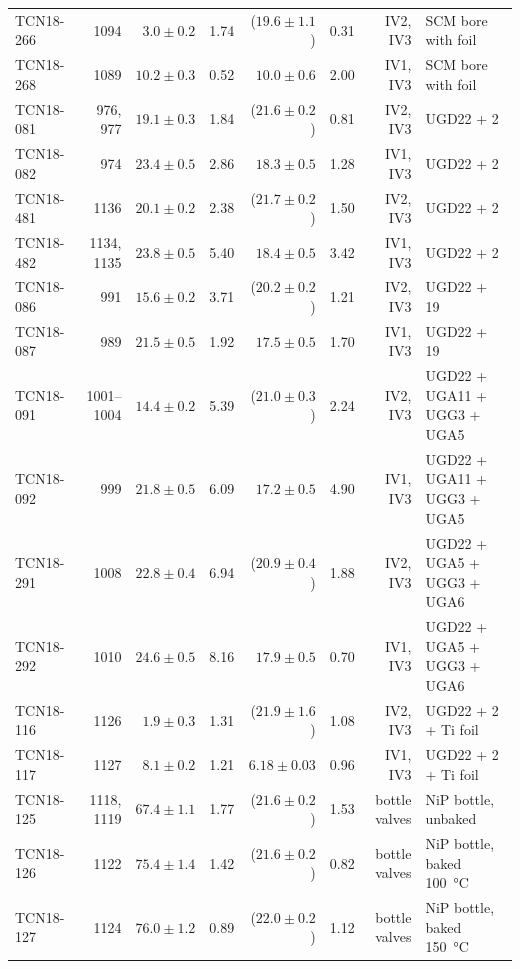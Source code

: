 \documentclass[10pt,letterpaper]{article}
\begin{document}
\begin{table}
\begin{tabular}{l r r r r r r l}
TCN18-266 & 1094 & $3.0 \pm 0.2$ & 1.74 & ($19.6 \pm 1.1$) & 0.31 & IV2, IV3 & SCM bore with foil \\
TCN18-268 & 1089 & $10.2 \pm 0.3$ & 0.52 & $10.0 \pm 0.6$ & 2.00 & IV1, IV3 & SCM bore with foil \\
TCN18-081 & 976, 977 & $19.1 \pm 0.3$ & 1.84 & ($21.6 \pm 0.2$) & 0.81 & IV2, IV3 & UGD22 + 2 \\
TCN18-082 & 974 & $23.4 \pm 0.5$ & 2.86 & $18.3 \pm 0.5$ & 1.28 & IV1, IV3 & UGD22 + 2 \\
TCN18-481 & 1136 & $20.1 \pm 0.2$ & 2.38 & ($21.7 \pm 0.2$) & 1.50 & IV2, IV3 & UGD22 + 2 \\
TCN18-482 & 1134, 1135 & $23.8 \pm 0.5$ & 5.40 & $18.4 \pm 0.5$ & 3.42 & IV1, IV3 & UGD22 + 2 \\
TCN18-086 & 991 & $15.6 \pm 0.2$ & 3.71 & ($20.2 \pm 0.2$) & 1.21 & IV2, IV3 & UGD22 + 19 \\
TCN18-087 & 989 & $21.5 \pm 0.5$ & 1.92 & $17.5 \pm 0.5$ & 1.70 & IV1, IV3 & UGD22 + 19 \\
TCN18-091 & 1001--1004 & $14.4 \pm 0.2$ & 5.39 & ($21.0 \pm 0.3$) & 2.24 & IV2, IV3 & UGD22 + UGA11 + UGG3 + UGA5 \\
TCN18-092 & 999 & $21.8 \pm 0.5$ & 6.09 & $17.2 \pm 0.5$ & 4.90 & IV1, IV3 & UGD22 + UGA11 + UGG3 + UGA5 \\
TCN18-291 & 1008 & $22.8 \pm 0.4$ & 6.94 & ($20.9 \pm 0.4$) & 1.88 & IV2, IV3 & UGD22 + UGA5 + UGG3 + UGA6 \\
TCN18-292 & 1010 & $24.6 \pm 0.5$ & 8.16 & $17.9 \pm 0.5$ & 0.70 & IV1, IV3 & UGD22 + UGA5 + UGG3 + UGA6 \\
TCN18-116 & 1126 & $1.9 \pm 0.3$ & 1.31 & ($21.9 \pm 1.6$) & 1.08 & IV2, IV3 & UGD22 + 2 + Ti foil \\
TCN18-117 & 1127 & $8.1 \pm 0.2$ & 1.21 & $6.18 \pm 0.03$ & 0.96 & IV1, IV3 & UGD22 + 2 + Ti foil \\
TCN18-125 & 1118, 1119 & $67.4 \pm 1.1$ & 1.77 & ($21.6 \pm 0.2$) & 1.53 & bottle valves & NiP bottle, unbaked \\
TCN18-126 & 1122 & $75.4 \pm 1.4$ & 1.42 & ($21.6 \pm 0.2$) & 0.82 & bottle valves & NiP bottle, baked \SI{100}{\celsius} \\
TCN18-127 & 1124 & $76.0 \pm 1.2$ & 0.89 & ($22.0 \pm 0.2$) & 1.12 & bottle valves & NiP bottle, baked \SI{150}{\celsius} \\
\bottomrule
\end{tabular}
\label{tab:storagelifetime_with_monitor2}
\end{table}
\end{document}

